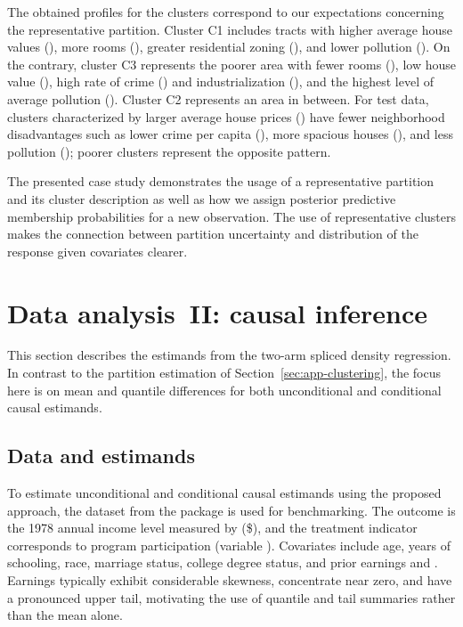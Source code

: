 \documentclass[article]{jss}\usepackage[]{graphicx}\usepackage[]{xcolor}
\begin{document}
The obtained profiles for the clusters correspond to our expectations concerning the representative partition. Cluster C1 includes tracts with higher average house values (), more rooms (), greater residential zoning (), and lower pollution (). On the contrary, cluster C3 represents the poorer area with fewer rooms (), low house value (), high rate of crime () and industrialization (), and the highest level of average pollution (). Cluster C2 represents an area in between. For test data, clusters characterized by larger average house prices () have fewer neighborhood disadvantages such as lower crime per capita (), more spacious houses (), and less pollution (); poorer clusters represent the opposite pattern.

The presented case study demonstrates the usage of a representative partition and its cluster description as well as how we assign posterior predictive membership probabilities for a new observation. The use of representative clusters makes the connection between partition uncertainty and distribution of the response given covariates clearer.

\section{Data analysis~II: causal inference}
\label{sec:app-causal}

This section describes the estimands from the two-arm spliced density regression. In contrast to the partition estimation of Section~\ref{sec:app-clustering}, the focus here is on mean and quantile differences for both unconditional and conditional causal estimands.

\subsection{Data and estimands}

To estimate unconditional and conditional causal estimands using the proposed approach, the  dataset from the   package is used for benchmarking. The outcome is the 1978 annual income level measured by  (\$), and the treatment indicator corresponds to program participation (variable ). Covariates include age, years of schooling, race, marriage status, college degree status, and prior earnings  and . Earnings typically exhibit considerable skewness, concentrate near zero, and have a pronounced upper tail, motivating the use of quantile and tail summaries rather than the mean alone.
\end{document}
